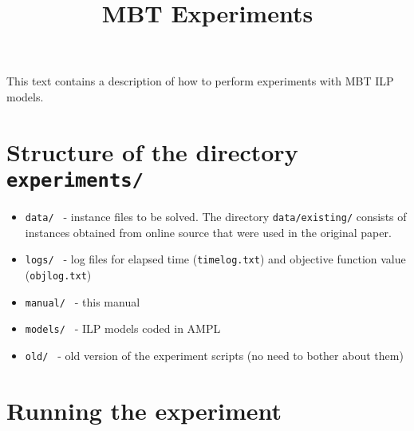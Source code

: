 \documentclass[12pt]{article}
\title{MBT Experiments}
\begin{document}
\maketitle
This text contains a description of how to perform experiments with MBT ILP models.

\section{Structure of the directory \texttt{experiments/}}
\begin{itemize}
	\item\texttt{data/ } - instance files to be solved. The directory \texttt{data/existing/} consists of instances obtained from online source that were used in the original paper.
	\item\texttt{logs/ } - log files for elapsed time (\texttt{timelog.txt}) and objective function value (\texttt{objlog.txt})
	\item\texttt{manual/ } - this manual
	\item\texttt{models/ } - ILP models coded in AMPL
	\item\texttt{old/ } - old version of the experiment scripts (no need to bother about them)
\end{itemize}

\section{Running the experiment}
\end{document}
